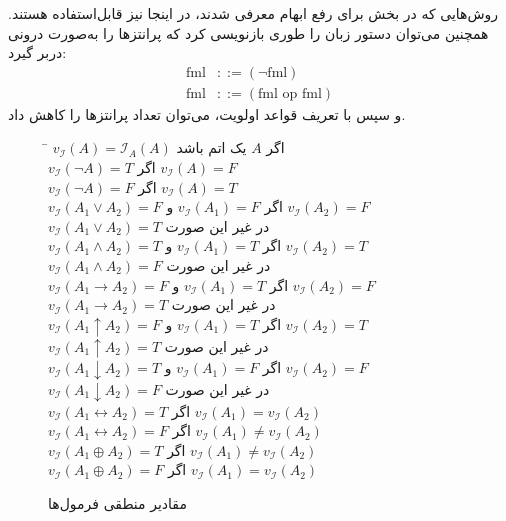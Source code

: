   روش‌هایی که در بخش  برای رفع ابهام معرفی شدند، در اینجا نیز قابل‌استفاده هستند.
  همچنین می‌توان دستور زبان را طوری بازنویسی کرد که پرانتزها را به‌صورت درونی دربر گیرد:
  \begin{align*}
    \text{fml} &::= (\neg \text{fml}) \\
    \text{fml} &::= (\text{fml op fml})
  \end{align*}
  و سپس با تعریف قواعد اولویت، می‌توان تعداد پرانتزها را کاهش داد.
  
  \begin{figure}[ht]
  \centering
    \begin{RTL}
      \begin{tabbing}
      \hspace{6.5cm} \= \kill
        $v_{\mathscr{I}}(A) = \mathscr{I}_A(A)$ \> اگر $A$ یک اتم باشد \\
        $v_{\mathscr{I}}(\neg A) = T$ \> اگر $v_{\mathscr{I}}(A) = F$ \\
        $v_{\mathscr{I}}(\neg A) = F$ \> اگر $v_{\mathscr{I}}(A) = T$ \\
        $v_{\mathscr{I}}(A_1 \lor A_2) = F$ \> اگر $v_{\mathscr{I}}(A_1) = F$ و $v_{\mathscr{I}}(A_2) = F$ \\
        $v_{\mathscr{I}}(A_1 \lor A_2) = T$ \> در غیر این صورت \\
        $v_{\mathscr{I}}(A_1 \land A_2) = T$ \> اگر $v_{\mathscr{I}}(A_1) = T$ و $v_{\mathscr{I}}(A_2) = T$ \\
        $v_{\mathscr{I}}(A_1 \land A_2) = F$ \> در غیر این صورت \\
        $v_{\mathscr{I}}(A_1 \rightarrow A_2) = F$ \> اگر $v_{\mathscr{I}}(A_1) = T$ و $v_{\mathscr{I}}(A_2) = F$ \\
        $v_{\mathscr{I}}(A_1 \rightarrow A_2) = T$ \> در غیر این صورت \\
        $v_{\mathscr{I}}(A_1 \uparrow A_2) = F$ \> اگر $v_{\mathscr{I}}(A_1) = T$ و $v_{\mathscr{I}}(A_2) = T$ \\
        $v_{\mathscr{I}}(A_1 \uparrow A_2) = T$ \> در غیر این صورت \\
        $v_{\mathscr{I}}(A_1 \downarrow A_2) = T$ \> اگر $v_{\mathscr{I}}(A_1) = F$ و $v_{\mathscr{I}}(A_2) = F$ \\
        $v_{\mathscr{I}}(A_1 \downarrow A_2) = F$ \> در غیر این صورت \\
        $v_{\mathscr{I}}(A_1 \leftrightarrow A_2) = T$ \> اگر $v_{\mathscr{I}}(A_1) = v_{\mathscr{I}}(A_2)$ \\
        $v_{\mathscr{I}}(A_1 \leftrightarrow A_2) = F$ \> اگر $v_{\mathscr{I}}(A_1) \ne v_{\mathscr{I}}(A_2)$ \\
        $v_{\mathscr{I}}(A_1 \oplus A_2) = T$ \> اگر $v_{\mathscr{I}}(A_1) \ne v_{\mathscr{I}}(A_2)$ \\
        $v_{\mathscr{I}}(A_1 \oplus A_2) = F$ \> اگر $v_{\mathscr{I}}(A_1) = v_{\mathscr{I}}(A_2)$ \\
      \end{tabbing}
    \end{RTL}
    \renewcommand{\thefigure}{\lr{2.3}}
    \caption{مقادیر منطقی فرمول‌ها}
  \end{figure}